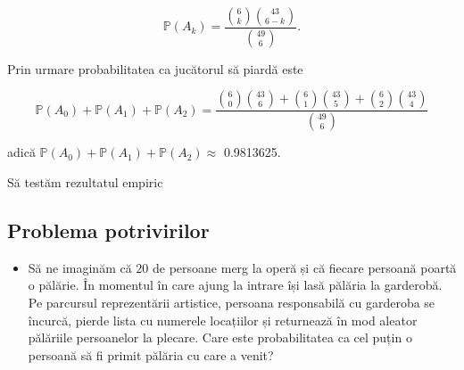 \documentclass[]{article}
\newenvironment{Shaded}{\begin{snugshade}}{\end{snugshade}}
\newcommand{\KeywordTok}[1]{\textcolor[rgb]{0.13,0.29,0.53}{\textbf{#1}}}
\newcommand{\DecValTok}[1]{\textcolor[rgb]{0.00,0.00,0.81}{#1}}
\newcommand{\FloatTok}[1]{\textcolor[rgb]{0.00,0.00,0.81}{#1}}
\newcommand{\StringTok}[1]{\textcolor[rgb]{0.31,0.60,0.02}{#1}}
\newcommand{\CommentTok}[1]{\textcolor[rgb]{0.56,0.35,0.01}{\textit{#1}}}
\newcommand{\OperatorTok}[1]{\textcolor[rgb]{0.81,0.36,0.00}{\textbf{#1}}}
\newcommand{\NormalTok}[1]{#1}
\newenvironment{frshaded*}{%
  \def\FrameCommand{\fboxrule=\FrameRule\fboxsep=\FrameSep \fcolorbox{framecolor}{shadecolor1}}%
  \MakeFramed {\advance\hsize-\width \FrameRestore}}%
{\endMakeFramed}
\newenvironment{rmdblock}[1]
  {\begin{frshaded*}
  \begin{itemize}
  \renewcommand{\labelitemi}{
    \raisebox{-.7\height}[0pt][0pt]{
      {\setkeys{Gin}{width=2em,keepaspectratio}\texttt{[image: images/icons/\#1]}}
    }
  }
  \item
  }
  {
  \end{itemize}
  \end{frshaded*}
  }
\newenvironment{rmdexercise}
  {\begin{rmdblock}{exercise}}
  {\end{rmdblock}}
\begin{document}
\[
  \mathbb{P}(A_k) = \frac{\binom{6}{k}\binom{43}{6-k}}{\binom{49}{6}}.
\]

Prin urmare probabilitatea ca jucătorul să piardă este

\[
  \mathbb{P}(A_0) + \mathbb{P}(A_1) + \mathbb{P}(A_2) = \frac{\binom{6}{0}\binom{43}{6} + \binom{6}{1}\binom{43}{5} +\binom{6}{2}\binom{43}{4}}{\binom{49}{6}}
\]

adică \(\mathbb{P}(A_0) + \mathbb{P}(A_1) + \mathbb{P}(A_2)\approx\)
0.9813625.

Să testăm rezultatul empiric

\begin{Shaded}
\end{Shaded}

\subsection{Problema potrivirilor}\label{problema-potrivirilor}

\begin{rmdexercise}
Să ne imaginăm că \(20\) de persoane merg la operă și că fiecare
persoană poartă o pălărie. În momentul în care ajung la intrare își lasă
pălăria la garderobă. Pe parcursul reprezentării artistice, persoana
responsabilă cu garderoba se încurcă, pierde lista cu numerele
locațiilor și returnează în mod aleator pălăriile persoanelor la
plecare. Care este probabilitatea ca cel puțin o persoană să fi primit
pălăria cu care a venit?
\end{rmdexercise}
\end{document}
